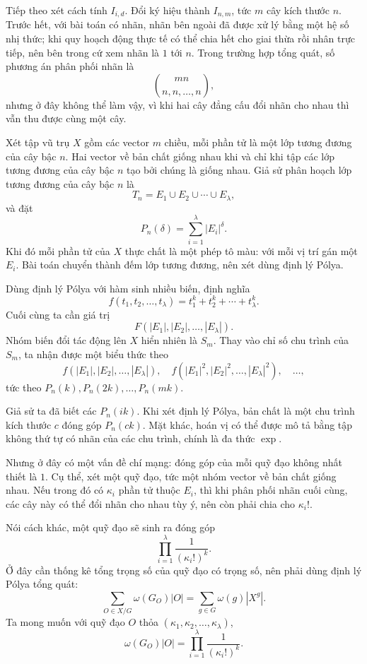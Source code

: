 \documentclass[11pt]{article}
\begin{document}
Tiếp theo xét cách tính \(I_{i,d}\). Đổi ký hiệu thành \(I_{n,m}\), tức \(m\)
cây kích thước \(n\). Trước hết, với bài toán có nhãn, nhãn bên ngoài đã được
xử lý bằng một hệ số nhị thức; khi quy hoạch động thực tế có thể chia hết cho
giai thừa rồi nhân trực tiếp, nên bên trong cứ xem nhãn là \(1\) tới \(n\).
Trong trường hợp tổng quát, số phương án phân phối nhãn là
\[
  \binom{mn}{n,n,\ldots,n},
\]
nhưng ở đây không thể làm vậy, vì khi hai cây đẳng cấu đổi nhãn cho nhau thì
vẫn thu được cùng một cây.

Xét tập vũ trụ \(X\) gồm các vector \(m\) chiều, mỗi phần tử là một lớp tương
đương của cây bậc \(n\). Hai vector về bản chất giống nhau khi và chỉ khi tập
các lớp tương đương của cây bậc \(n\) tạo bởi chúng là giống nhau. Giả sử phân
hoạch lớp tương đương của cây bậc \(n\) là
\[
  T_n=E_1\cup E_2\cup\cdots\cup E_\lambda,
\]
và đặt
\[
  P_n(\delta)=\sum_{i=1}^{\lambda}|E_i|^\delta.
\]
Khi đó mỗi phần tử của \(X\) thực chất là một phép tô màu: với mỗi vị trí gán
một \(E_i\). Bài toán chuyển thành đếm lớp tương đương, nên xét dùng định lý
Pólya.

Dùng định lý Pólya với hàm sinh nhiều biến, định nghĩa
\[
  f(t_1,t_2,\ldots,t_\lambda)=t_1^k+t_2^k+\cdots+t_\lambda^k.
\]
Cuối cùng ta cần giá trị
\[
  F(|E_1|,|E_2|,\ldots,|E_\lambda|).
\]
Nhóm biến đổi tác động lên \(X\) hiển nhiên là \(S_m\). Thay vào chỉ số chu
trình của \(S_m\), ta nhận được một biểu thức theo
\[
  f(|E_1|,|E_2|,\ldots,|E_\lambda|),\quad
  f(|E_1|^2,|E_2|^2,\ldots,|E_\lambda|^2),\quad \ldots,
\]
tức theo \(P_n(k),P_n(2k),\ldots,P_n(mk)\).

Giả sử ta đã biết các \(P_n(ik)\). Khi xét định lý Pólya, bản chất là một chu
trình kích thước \(c\) đóng góp \(P_n(ck)\). Mặt khác, hoán vị có thể được mô
tả bằng tập không thứ tự có nhãn của các chu trình, chính là đa thức
\(\exp\).

Nhưng ở đây có một vấn đề chí mạng: đóng góp của mỗi quỹ đạo không nhất thiết
là \(1\). Cụ thể, xét một quỹ đạo, tức một nhóm vector về bản chất giống nhau.
Nếu trong đó có \(\kappa_i\) phần tử thuộc \(E_i\), thì khi phân phối nhãn cuối
cùng, các cây này có thể đổi nhãn cho nhau tùy ý, nên còn phải chia cho
\(\kappa_i!\).

Nói cách khác, một quỹ đạo sẽ sinh ra đóng góp
\[
  \prod_{i=1}^{\lambda}\frac{1}{(\kappa_i!)^k}.
\]
Ở đây cần thống kê tổng trọng số của quỹ đạo có trọng số, nên phải dùng định
lý Pólya tổng quát:
\[
  \sum_{O\in X/G}\omega(G_O)|O|
  =
  \sum_{g\in G}\omega(g)|X^g|.
\]
Ta mong muốn với quỹ đạo \(O\) thỏa \((\kappa_1,\kappa_2,\ldots,\kappa_\lambda)\),
\[
  \omega(G_O)|O|
  =
  \prod_{i=1}^{\lambda}\frac{1}{(\kappa_i!)^k}.
\]
\end{document}
